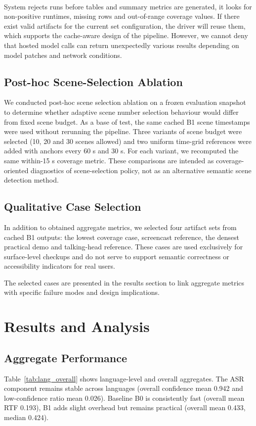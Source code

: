 ﻿﻿\documentclass[conference]{IEEEtran}
\begin{document}
System rejects runs before tables and summary metrics are generated, it looks for non-positive runtimes, missing rows and out-of-range coverage values. If there exist valid artifacts for the current set configuration, the driver will reuse them, which supports the cache-aware design of the pipeline. However, we cannot deny that hosted model calls can return unexpectedly various results depending on model patches and network conditions.

\subsection{Post-hoc Scene-Selection Ablation}
We conducted post-hoc scene selection ablation on a frozen evaluation snapshot to determine whether adaptive scene number selection behaviour would differ from fixed scene budget. As a base of test, the same cached B1 scene timestamps were used without rerunning the pipeline. Three variants of scene budget were selected (10, 20 and 30 scenes allowed) and two uniform time-grid references were added with anchors every 60 s and 30 s. For each variant, we recomputed the same within-15 s coverage metric. These comparisons are intended as coverage-oriented diagnostics of scene-selection policy, not as an alternative semantic scene detection method.

\subsection{Qualitative Case Selection}
In addition to obtained aggregate metrics, we selected four artifact sets from cached B1 outputs: the lowest coverage case, screencast reference, the densest practical demo and talking-head reference. These cases are used exclusively for surface-level checkups and do not serve to support semantic correctness or accessibility indicators for real users.

The selected cases are presented in the results section to link aggregate metrics with specific failure modes and design implications.

\FloatBarrier
\section{Results and Analysis}
\subsection{Aggregate Performance}
Table~\ref{tab:lang_overall} shows language-level and overall aggregates. The ASR component remains stable across languages (overall confidence mean 0.942 and low-confidence ratio mean 0.026). Baseline B0 is consistently fast (overall mean RTF 0.193), B1 adds slight overhead but remains practical (overall mean 0.433, median 0.424).
\end{document}
